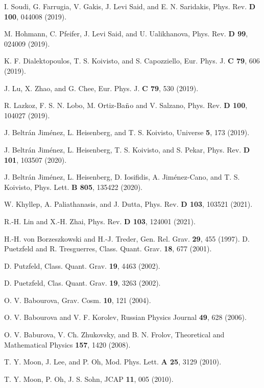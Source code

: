 \documentclass[aps,superscriptaddress, showpacs,preprintnumbers, superscriptaddress, nofootinbibt,twocolumn]{revtex4}
\begin{document}
\begin{thebibliography}{99}
 I. Soudi, G. Farrugia, V. Gakis, J. Levi Said, and E. N.
Saridakis, Phys. Rev. {\bf D 100}, 044008 (2019).

 M. Hohmann, C. Pfeifer, J. Levi Said, and U. Ualikhanova, Phys. Rev. {\bf D 99}, 024009 (2019).

 K. F. Dialektopoulos, T. S. Koivisto, and S. Capozziello,
Eur. Phys. J. {\bf C 79}, 606 (2019).

 J. Lu, X. Zhao, and G. Chee, Eur. Phys. J. {\bf C 79}, 530
(2019).

 R. Lazkoz, F. S. N. Lobo, M. Ortiz-Ba${\rm \tilde{n}}$o and V.
Salzano, Phys. Rev. {\bf D 100}, 104027 (2019).

 J. Beltr\'{a}n Jim\'{e}nez, L. Heisenberg, and T. S. Koivisto,
Universe {\bf 5}, 173 (2019).

 J. Beltr\'{a}n Jim\'{e}nez, L. Heisenberg, T. S. Koivisto, and
S. Pekar, Phys. Rev. {\bf D 101}, 103507 (2020).

 J. Beltr\'{a}n Jim\'{e}nez, L. Heisenberg, D. Iosifidis, A.
Jim\'{e}nez-Cano, and T. S. Koivisto, Phys. Lett. {\bf B 805},
135422 (2020).

 W. Khyllep, A. Paliathanasis, and J. Dutta, Phys. Rev. {\bf D 103}, 103521 (2021).

 R.-H. Lin and X.-H. Zhai, Phys. Rev. {\bf D 103}, 124001 (2021).

  H.-H. von Borzeszkowski and H.-J. Treder, Gen. Rel. Grav. {\bf 29},  455 (1997).
 D. Puetzfeld and R. Tresguerres, Class. Quant.
Grav. {\bf 18},  677 (2001).

 D. Putzfeld, Class. Quant. Grav. {\bf 19},  4463 (2002).

  D. Puetzfeld, Clas. Quant. Grav. {\bf 19}, 3263 (2002).

 O. V. Babourova, Grav. Cosm. {\bf 10},  121 (2004).

  O. V. Babourova and V. F. Korolev, Russian Physics Journal {\bf 49}, 628 (2006).

  O. V. Baburova, V. Ch. Zhukovsky, and B. N. Frolov, Theoretical and Mathematical Physics {\bf 157},  1420 (2008).


 T. Y. Moon, J. Lee, and P. Oh, Mod. Phys. Lett. {\bf A 25}, 3129 (2010).

  T. Y. Moon, P. Oh, J. S. Sohn, JCAP {\bf 11}, 005 (2010).


\end{thebibliography}
\end{document}
